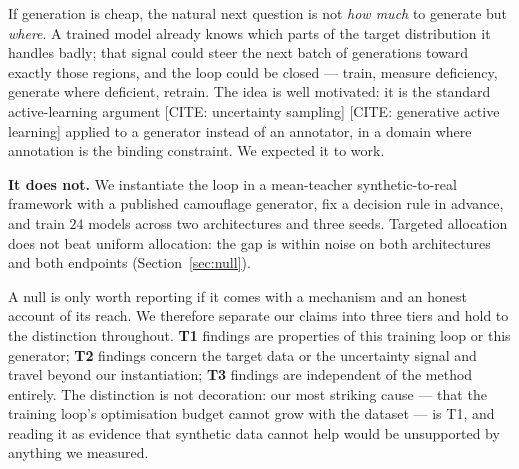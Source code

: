 \documentclass{article}
\begin{document}
If generation is cheap, the natural next question is not \emph{how much} to
generate but \emph{where}. A trained model already knows which parts of the
target distribution it handles badly; that signal could steer the next batch of
generations toward exactly those regions, and the loop could be closed --- train,
measure deficiency, generate where deficient, retrain. The idea is well
motivated: it is the standard active-learning argument [CITE: uncertainty sampling] [CITE: generative active learning] applied to a generator instead of
an annotator, in a domain where annotation is the binding constraint. We
expected it to work.

\textbf{It does not.} We instantiate the loop in a mean-teacher
synthetic-to-real framework with a published camouflage generator, fix a decision
rule in advance, and train $24$ models across two architectures and three seeds.
Targeted allocation does not beat uniform allocation: the gap is within noise on
both architectures and both endpoints (Section~\ref{sec:null}).

A null is only worth reporting if it comes with a mechanism and an honest
account of its reach. We therefore separate our claims into three tiers and hold
to the distinction throughout. \textbf{T1} findings are properties of this
training loop or this generator; \textbf{T2} findings concern the target data or
the uncertainty signal and travel beyond our instantiation; \textbf{T3} findings
are independent of the method entirely. The distinction is not decoration: our
most striking cause --- that the training loop's optimisation budget cannot grow
with the dataset --- is T1, and reading it as evidence that synthetic data cannot
help would be unsupported by anything we measured.
\end{document}
